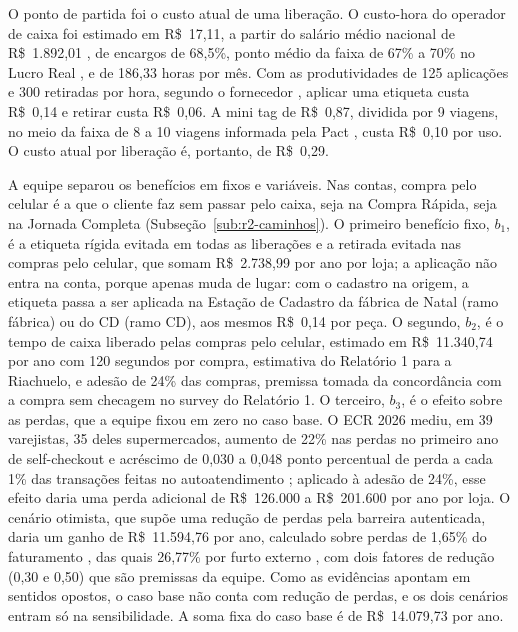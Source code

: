 O ponto de partida foi o custo atual de uma liberação. O custo-hora do operador de caixa foi estimado em R\$~17,11, a partir do salário médio nacional de R\$~1.892,01 \cite{salario2026operador}, de encargos de 68,5\%, ponto médio da faixa de 67\% a 70\% no Lucro Real \cite{contaja2026encargos}, e de 186,33 horas por mês. Com as produtividades de 125 aplicações e 300 retiradas por hora, segundo o fornecedor \cite{alltag2024sourcetagging}, aplicar uma etiqueta custa R\$~0,14 e retirar custa R\$~0,06. A mini tag de R\$~0,87, dividida por 9 viagens, no meio da faixa de 8 a 10 viagens informada pela Pact \cite{pact2026etiquetas}, custa R\$~0,10 por uso. O custo atual por liberação é, portanto, de R\$~0,29.

A equipe separou os benefícios em fixos e variáveis. Nas contas, compra pelo celular é a que o cliente faz sem passar pelo caixa, seja na Compra Rápida, seja na Jornada Completa (Subseção~\ref{sub:r2-caminhos}). O primeiro benefício fixo, $b_1$, é a etiqueta rígida evitada em todas as liberações e a retirada evitada nas compras pelo celular, que somam R\$~2.738,99 por ano por loja; a aplicação não entra na conta, porque apenas muda de lugar: com o cadastro na origem, a etiqueta passa a ser aplicada na Estação de Cadastro da fábrica de Natal (ramo fábrica) ou do CD (ramo CD), aos mesmos R\$~0,14 por peça. O segundo, $b_2$, é o tempo de caixa liberado pelas compras pelo celular, estimado em R\$~11.340,74 por ano com 120 segundos por compra, estimativa do Relatório 1 para a Riachuelo, e adesão de 24\% das compras, premissa tomada da concordância com a compra sem checagem no survey do Relatório 1. O terceiro, $b_3$, é o efeito sobre as perdas, que a equipe fixou em zero no caso base. O ECR 2026 mediu, em 39 varejistas, 35 deles supermercados, aumento de 22\% nas perdas no primeiro ano de self-checkout e acréscimo de 0,030 a 0,048 ponto percentual de perda a cada 1\% das transações feitas no autoatendimento \cite{ecr2026selfcheckout}; aplicado à adesão de 24\%, esse efeito daria uma perda adicional de R\$~126.000 a R\$~201.600 por ano por loja. O cenário otimista, que supõe uma redução de perdas pela barreira autenticada, daria um ganho de R\$~11.594,76 por ano, calculado sobre perdas de 1,65\% do faturamento \cite{cartacapital2026perdas}, das quais 26,77\% por furto externo \cite{foodforum2026perdas}, com dois fatores de redução (0,30 e 0,50) que são premissas da equipe. Como as evidências apontam em sentidos opostos, o caso base não conta com redução de perdas, e os dois cenários entram só na sensibilidade. A soma fixa do caso base é de R\$~14.079,73 por ano.

